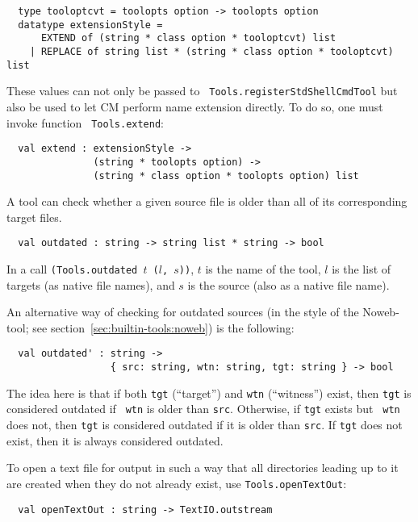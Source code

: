 \begin{lstlisting}
  type tooloptcvt = toolopts option -> toolopts option
  datatype extensionStyle =
      EXTEND of (string * class option * tooloptcvt) list
    | REPLACE of string list * (string * class option * tooloptcvt) list
\end{lstlisting}%

These values can not only be passed to {\tt
Tools.registerStdShellCmdTool} but also be used to let CM perform name
extension directly.  To do so, one must invoke function {\tt
Tools.extend}:

\begin{lstlisting}
  val extend : extensionStyle ->
               (string * toolopts option) ->
               (string * class option * toolopts option) list
\end{lstlisting}%

 A tool can check whether a given
source file is older than all of its corresponding target files.

\begin{lstlisting}
  val outdated : string -> string list * string -> bool
\end{lstlisting}%

In a call {\tt (Tools.outdated $t$ ($l$, $s$))}, $t$ is the name of
the tool, $l$ is the list of targets (as native file names),
and $s$ is the source (also as a native file name).

An alternative way of checking for outdated sources (in the style of
the Noweb-tool; see section~\ref{sec:builtin-tools:noweb}) is the
following:

\begin{lstlisting}
  val outdated' : string ->
                  { src: string, wtn: string, tgt: string } -> bool
\end{lstlisting}%

The idea here is that if both {\tt tgt} (``target'') and {\tt wtn}
(``witness'') exist, then {\tt tgt} is considered outdated if {\tt
wtn} is older than {\tt src}.  Otherwise, if {\tt tgt} exists but {\tt
wtn} does not, then {\tt tgt} is considered outdated if it is older
than {\tt src}.  If {\tt tgt} does not exist, then it is always
considered outdated.

  To open a text file for
output in such a way that all directories leading up to it are created
when they do not already exist, use {\tt Tools.openTextOut}:

\begin{lstlisting}
  val openTextOut : string -> TextIO.outstream
\end{lstlisting}%

